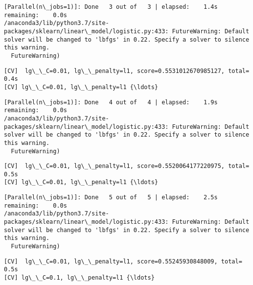 \documentclass[11pt]{article}
\begin{document}
    \begin{Verbatim}[commandchars=\\\{\}]
[Parallel(n\_jobs=1)]: Done   3 out of   3 | elapsed:    1.4s remaining:    0.0s
/anaconda3/lib/python3.7/site-packages/sklearn/linear\_model/logistic.py:433: FutureWarning: Default solver will be changed to 'lbfgs' in 0.22. Specify a solver to silence this warning.
  FutureWarning)

    \end{Verbatim}

    \begin{Verbatim}[commandchars=\\\{\}]
[CV]  lg\_\_C=0.01, lg\_\_penalty=l1, score=0.5531012670985127, total=   0.4s
[CV] lg\_\_C=0.01, lg\_\_penalty=l1 {\ldots}

    \end{Verbatim}

    \begin{Verbatim}[commandchars=\\\{\}]
[Parallel(n\_jobs=1)]: Done   4 out of   4 | elapsed:    1.9s remaining:    0.0s
/anaconda3/lib/python3.7/site-packages/sklearn/linear\_model/logistic.py:433: FutureWarning: Default solver will be changed to 'lbfgs' in 0.22. Specify a solver to silence this warning.
  FutureWarning)

    \end{Verbatim}

    \begin{Verbatim}[commandchars=\\\{\}]
[CV]  lg\_\_C=0.01, lg\_\_penalty=l1, score=0.5520064177220975, total=   0.5s
[CV] lg\_\_C=0.01, lg\_\_penalty=l1 {\ldots}

    \end{Verbatim}

    \begin{Verbatim}[commandchars=\\\{\}]
[Parallel(n\_jobs=1)]: Done   5 out of   5 | elapsed:    2.5s remaining:    0.0s
/anaconda3/lib/python3.7/site-packages/sklearn/linear\_model/logistic.py:433: FutureWarning: Default solver will be changed to 'lbfgs' in 0.22. Specify a solver to silence this warning.
  FutureWarning)

    \end{Verbatim}

    \begin{Verbatim}[commandchars=\\\{\}]
[CV]  lg\_\_C=0.01, lg\_\_penalty=l1, score=0.55245930848009, total=   0.5s
[CV] lg\_\_C=0.1, lg\_\_penalty=l1 {\ldots}

    \end{Verbatim}
\end{document}
